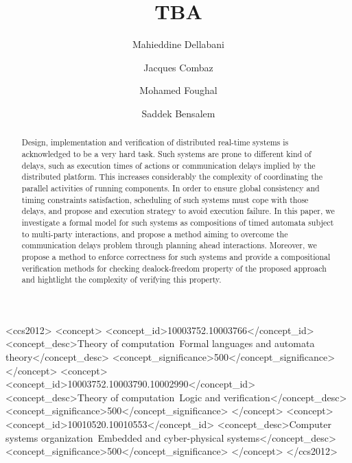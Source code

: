 \documentclass[format=acmtog]{acmart}
\begin{document}
\title{TBA}
\author{Mahieddine Dellabani}
\author{Jacques Combaz}
\author{Mohamed Foughal}
\author{Saddek Bensalem}



\renewcommand\shortauthors{Dellabani, Combaz, Foughal et al}



\begin{abstract}
Design, implementation and verification of distributed real-time systems is acknowledged to be a very hard task.
Such systems are prone to different kind of delays, such as execution times of actions or communication delays implied by the distributed platform.
This increases considerably the complexity of coordinating the parallel activities of running components.
In order to ensure global consistency and timing constraints satisfaction, scheduling of such systems must cope with those delays, and propose and execution strategy to avoid execution failure. 
In this paper, we investigate a formal model for such systems as compositions of timed automata subject to multi-party interactions, and propose 
a method aiming to overcome the communication delays problem through planning ahead interactions. Moreover, we propose a method to enforce correctness for such systems
and provide a compositional verification methods for checking dealock-freedom property of the proposed approach and hightlight the complexity of verifying this property.
\end{abstract}


\begin{CCSXML}
  <ccs2012>
  <concept>
  <concept_id>10003752.10003766</concept_id>
  <concept_desc>Theory of computation~Formal languages and automata theory</concept_desc>
  <concept_significance>500</concept_significance>
  </concept>
  <concept>
  <concept_id>10003752.10003790.10002990</concept_id>
  <concept_desc>Theory of computation~Logic and verification</concept_desc>
  <concept_significance>500</concept_significance>
  </concept>
  <concept>
  <concept_id>10010520.10010553</concept_id>
  <concept_desc>Computer systems organization~Embedded and cyber-physical systems</concept_desc>
  <concept_significance>500</concept_significance>
  </concept>
  </ccs2012>
\end{CCSXML}
\end{document}
